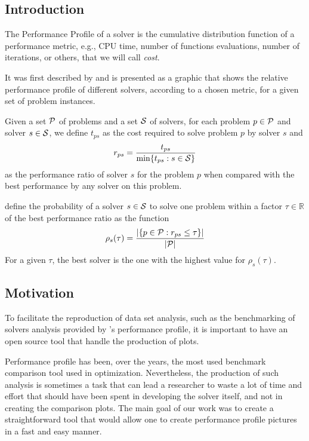 \subsection*{Introduction}

    The Performance Profile of a solver is the cumulative distribution
    function of a performance metric, e.g., CPU time, number of functions
    evaluations, number of iterations, or others, that we will call \emph{cost}.

    It was first described by \textcite{Dolan:2002du} and is presented as a 
    graphic that shows the relative performance profile of different solvers, 
    according to a chosen metric, for a given set of problem instances.

    Given a set $\mathcal{P}$ of problems and a set $\mathcal{S}$ of solvers, for each 
    problem $p \in \mathcal{P}$ and solver $s \in \mathcal{S}$, we define $t_{ps}$ as the  
    cost required to solve problem $p$ by solver $s$ and
    \begin{align*}
      r_{ps} = \frac{t_{ps}}{\min\{t_{ps}: s \in \mathcal{S}\}}
    \end{align*}
    as the performance ratio of solver $s$ for the problem $p$ when compared
    with the best performance by any solver on this problem.

    \citeauthor{Dolan:2002du} define the probability of a solver $s \in \mathcal{S}$ to
    solve one problem within a factor $\tau \in \mathds{R}$ of the best
    performance ratio as the function
    \begin{align*}
      \rho_s(\tau) = \frac{| \{p \in \mathcal{P}: r_{ps} \leq \tau\} |}{| \mathcal{P} |}
    \end{align*}
    For a given $\tau$, the best solver is the one with the highest value for
    $\rho_s(\tau)$.

\subsection*{Motivation}

    To facilitate the reproduction of data set analysis, such as the
    benchmarking of solvers analysis provided by \citeauthor{Dolan:2002du}'s
    performance profile, it is important to have an open source tool that handle
    the production of plots.

    Performance profile has been, over the years, the most used benchmark
    comparison tool used in optimization. Nevertheless, the production of such
    analysis is sometimes a task that can lead a researcher to waste a lot of
    time and effort that should have been spent in developing the solver itself,
    and not in creating the comparison plots. The main goal of our work was to
    create  a straightforward  tool that would allow one to create performance
    profile pictures in a fast and easy manner.

